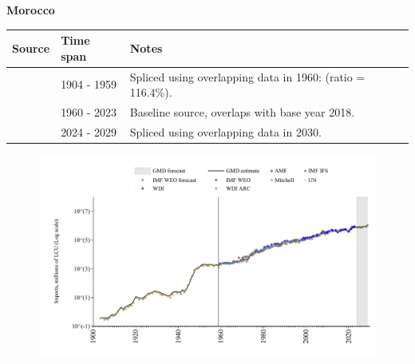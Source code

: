 \documentclass[12pt,a4paper,landscape]{article}
\begin{document}
\begin{adjustbox}{max totalsize={\paperwidth}{\paperheight},center}
\begin{minipage}[t][\textheight][t]{\textwidth}
\vspace*{0.5cm}
{}
\begin{center}
{\Large\bfseries Morocco}
\end{center}
\vspace{0.5cm}
\begin{table}[H]
\centering
\small
\begin{tabular}{|l|l|l|}
\hline
\textbf{Source} & \textbf{Time span} & \textbf{Notes} \\
\hline
\rowcolor{white}\cite{Mitchell}& 1904 - 1959 &Spliced using overlapping data in 1960: (ratio = 116.4\%).\\
\rowcolor{lightgray}\cite{WDI}& 1960 - 2023 &Baseline source, overlaps with base year 2018.\\
\rowcolor{white}\cite{IMF_WEO_forecast}& 2024 - 2029 &Spliced using overlapping data in 2030.\\
\hline
\end{tabular}
\end{table}
\begin{figure}[H]
\centering
\includegraphics[width=\textwidth,height=0.6\textheight,keepaspectratio]{graphs/MAR_imports.pdf}
\end{figure}
\end{minipage}
\end{adjustbox}
\end{document}

